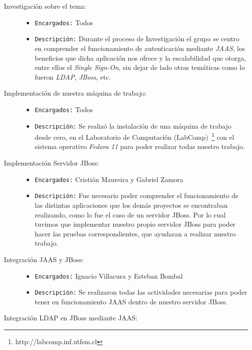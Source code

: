\begin{description}
	\item[Investigación sobre el tema:]
		\begin{itemize}
			\item \texttt{Encargados:} Todos
			\item \texttt{Descripción:}
				Durante el proceso de Investigación el grupo se centro en comprender el funcionamiento
				de autenticación mediante \emph{JAAS}, los beneficios que dicha aplicación nos ofrece y la
				escalabilidad que otorga, entre ellos el \emph{Single Sign-On}, sin dejar de lado otras temáticas
				como lo fueron \emph{LDAP}, \emph{JBoss}, etc.
		\end{itemize}
	\item[Implementación de nuestra máquina de trabajo:]
		\begin{itemize}
			\item \texttt{Encargados:} Todos
			\item \texttt{Descripción:}
				Se realizó la instalación de una máquina de trabajo desde cero,
				en el Laboratorio de Computación (LabComp)~\footnote{http://labcomp.inf.utfsm.cl}
				con el sistema operativo \emph{Fedora 11} para poder realizar todas nuestro
				trabajo.
		\end{itemize}
	\item[Implementación Servidor JBoss:]
		\begin{itemize}
			\item \texttt{Encargados:} Cristián Maureira y Gabriel Zamora
			\item \texttt{Descripción:}
				Fue necesario poder comprender el funcionamiento de las distintas aplicaciones
				que los demás proyectos se encontraban realizando, como lo fue el caso de un servidor JBoss.
				Por lo cual tuvimos que implementar nuestro propio servidor JBoss para poder hacer las pruebas
				correspondientes, que ayudaran a realizar nuestro trabajo.
		\end{itemize}
	\item[Integración JAAS y JBoss:]
		\begin{itemize}
			\item \texttt{Encargados:} Ignacio Villacura y Esteban Bombal
			\item \texttt{Descripción:}
				Se realizaron todas las actividades necesarias para poder tener en funcionamiento
				JAAS dentro de nuestro servidor JBoss.
		\end{itemize}
	\item[Integración LDAP en JBoss mediante JAAS:]

\end{description}
